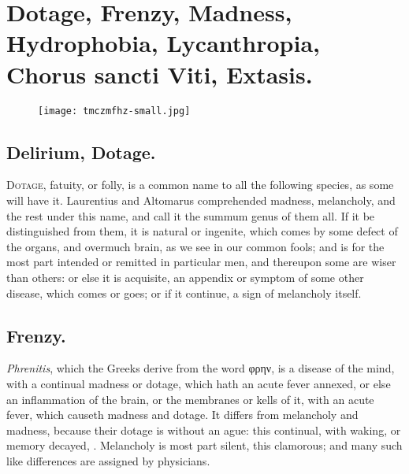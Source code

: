 {\section[Madness]{Dotage, Frenzy, Madness, Hydrophobia, Lycanthropia, Chorus sancti Viti, Extasis.}
\begin{figure}[H]
  \begingroup
  \centering
  \texttt{[image: tmczmfhz-small.jpg]}
  \label{fig:madness}
\end{figure}
\subsection{Delirium, Dotage.}
\lettrine{D}{otage}, fatuity, or folly, is a common name to all
the following species, as some will have it. Laurentius and 
Altomarus comprehended madness, melancholy, and the rest under this
name, and call it the summum genus of them all. If it be distinguished
from them, it is natural or ingenite, which comes by some defect of the
organs, and overmuch brain, as we see in our common fools; and is for
the most part intended or remitted in particular men, and thereupon
some are wiser than others: or else it is acquisite, an appendix or
symptom of some other disease, which comes or goes; or if it continue,
a sign of melancholy itself.

\subsection{Frenzy.}
\emph{Phrenitis}, which the Greeks derive from the word \textgreek{φρην}, is
a disease of the mind, with a continual madness or dotage, which hath
an acute fever annexed, or else an inflammation of the brain, or the
membranes or kells of it, with an acute fever, which causeth madness
and dotage. It differs from melancholy and madness, because their
dotage is without an ague: this continual, with waking, or memory
decayed, \etc{}. Melancholy is most part silent, this clamorous; and many
such like differences are assigned by physicians.

}
